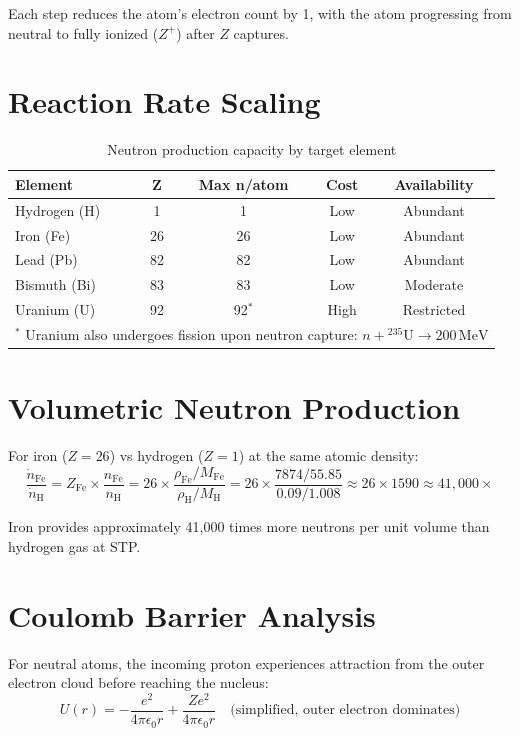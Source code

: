 \documentclass[12pt,a4paper]{article}
\begin{document}
Each step reduces the atom's electron count by 1, with the
atom progressing from neutral to fully ionized ($Z^+$) after
$Z$ captures.

\section{Reaction Rate Scaling}

\begin{table}[h!]
\centering
\caption{Neutron production capacity by target element}
\vspace{0.5em}
\begin{tabular}{lcccc}
\toprule
\textbf{Element} & \textbf{Z} & \textbf{Max n/atom} & \textbf{Cost} & \textbf{Availability} \\
\midrule
Hydrogen (H) & 1 & 1 & Low & Abundant \\
Iron (Fe) & 26 & 26 & Low & Abundant \\
Lead (Pb) & 82 & 82 & Low & Abundant \\
Bismuth (Bi) & 83 & 83 & Low & Moderate \\
Uranium (U) & 92 & 92$^*$ & High & Restricted \\
\bottomrule
\multicolumn{5}{l}{$^*$ Uranium also undergoes fission upon neutron capture: $n + {}^{235}\text{U} \rightarrow 200\,\text{MeV}$}
\end{tabular}
\end{table}

\section{Volumetric Neutron Production}

For iron ($Z = 26$) vs hydrogen ($Z = 1$) at the same atomic density:
\begin{equation}
\frac{\dot{n}_\text{Fe}}{\dot{n}_\text{H}}
= Z_\text{Fe} \times \frac{n_\text{Fe}}{n_\text{H}}
= 26 \times \frac{\rho_\text{Fe}/M_\text{Fe}}{\rho_\text{H}/M_\text{H}}
= 26 \times \frac{7874/55.85}{0.09/1.008}
\approx 26 \times 1590 \approx 41,000\times
\end{equation}

Iron provides approximately 41,000 times more neutrons per unit
volume than hydrogen gas at STP.

\section{Coulomb Barrier Analysis}

For neutral atoms, the incoming proton experiences attraction
from the outer electron cloud before reaching the nucleus:
\begin{equation}
U(r) = -\frac{e^2}{4\pi\epsilon_0 r}
+ \frac{Ze^2}{4\pi\epsilon_0 r}
\quad \text{(simplified, outer electron dominates)}
\end{equation}
\end{document}
